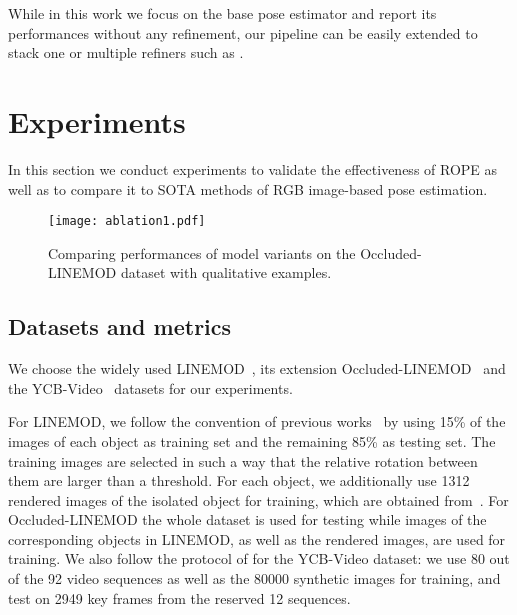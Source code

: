 \documentclass[10pt,twocolumn,letterpaper]{article}
\begin{document}
While in this work we focus on the base pose estimator and report its performances without any refinement, our pipeline can be easily extended to stack one or multiple refiners such as \cite{Manhardt2018deep, Li2018deepim, sundermeyer2020multi}.















\section{Experiments}
In this section we conduct experiments to validate the effectiveness of ROPE as well as to compare it to SOTA methods of RGB image-based pose estimation.

\begin{figure*}[ht]
    \centering
    \texttt{[image: ablation1.pdf]}
    \caption{Comparing performances of model variants on the Occluded-LINEMOD dataset with qualitative examples. }
    \label{fig:ablation1}
\end{figure*}

\subsection{Datasets and metrics}
We choose the widely used LINEMOD~\cite{Hinterstoisser2012model}, its extension Occluded-LINEMOD~\cite{Brachmann2014learning} and the YCB-Video~\cite{Xiang2018posecnn} datasets for our experiments. 

For LINEMOD, we follow the convention of previous works~\cite{rad2017bb8, tekin2018real, Peng2019pvnet, Zakharov2019dpod} by using 15\% of the images of each object as training set and the remaining 85\% as testing set. The training images are selected in such a way that the relative rotation between them are larger than a threshold. For each object, we additionally use 1312 rendered images of the isolated object for training, which are obtained from~\cite{hodan2018bop}. For Occluded-LINEMOD the whole dataset is used for testing while images of the corresponding objects in LINEMOD, as well as the rendered images, are used for training. We also follow the protocol of \cite{Xiang2018posecnn, Oberweger2018making} for the YCB-Video dataset: we use 80 out of the 92 video sequences as well as the 80000 synthetic images for training, and test on 2949 key frames from the reserved 12 sequences.  
\end{document}

